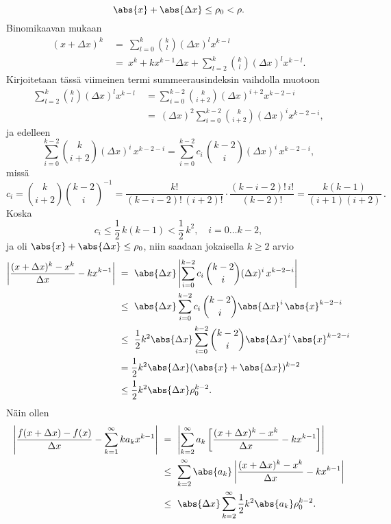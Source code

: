 \[
\abs{x}+\abs{\Delta x} \le \rho_0<\rho.
\]
Binomikaavan mukaan
\begin{align*}
(x+\Delta x)^k\ &=\ \sum_{l=0}^k \binom{k}{l} (\Delta x)^l x^{k-l} \\
                &=\ x^k + kx^{k-1}\Delta x + \sum_{l=2}^k \binom{k}{l} (\Delta x)^l x^{k-l}.
\end{align*}
Kirjoitetaan tässä viimeinen termi summeerausindeksin vaihdolla muotoon
\begin{align*}
\sum_{l=2}^k \binom{k}{l} (\Delta x)^l x^{k-l}\ 
              &= \sum_{i=0}^{k-2} \binom{k}{i+2} (\Delta x)^{i+2} x^{k-2-i} \\
              &=\ (\Delta x)^2 \sum_{i=0}^{k-2} \binom{k}{i+2} (\Delta x)^i x^{k-2-i},
\end{align*}
ja edelleen
\[
\sum_{i=0}^{k-2} \binom{k}{i+2} (\Delta x)^i\,x^{k-2-i} 
                = \sum_{i=0}^{k-2} c_i\,\binom{k-2}{i} (\Delta x)^i\,x^{k-2-i},
\]
missä
\[
c_i = \binom{k}{i+2} \binom{k-2}{i}^{-1} 
    = \frac{k!}{(k-i-2)!\,(i+2)!} \cdot \frac{(k-i-2)!\,i!}{(k-2)!} 
    = \frac{k(k-1)}{(i+1)(i+2)}\,.
\]
Koska
\[
c_i \le \frac{1}{2}\,k(k-1) < \frac{1}{2}\,k^2, \quad i = 0 \ldots k-2,
\]
ja oli $\abs{x}+\abs{\Delta x} \le \rho_0$, niin saadaan jokaisella $k \ge 2$ arvio
\begin{align*}
\left|\frac{(x+\Delta x)^k - x^k}{\Delta x} - kx^{k-1}\right|\ 
 &=\ \abs{\Delta x} \left|\sum_{i=0}^{k-2} c_i\,\binom{k-2}{i} (\Delta x)^i\,x^{k-2-i}\right| \\
 &\le\ \abs{\Delta x} \sum_{i=0}^{k-2} c_i\,\binom{k-2}{i} \abs{\Delta x}^i\,\abs{x}^{k-2-i} \\
 &\le\ \frac{1}{2}k^2\abs{\Delta x} 
               \sum_{i=0}^{k-2} \binom{k-2}{i} \abs{\Delta x}^i\,\abs{x}^{k-2-i} \\
 &= \frac{1}{2}k^2\abs{\Delta x}(\abs{x}+\abs{\Delta x})^{k-2} \\
 &\le \frac{1}{2}k^2\abs{\Delta x}\rho_0^{k-2}.
\end{align*}
Näin ollen
\begin{align*}
\left| \frac{f(x+\Delta x)-f(x)}{\Delta x} - \sum_{k=1}^\infty ka_kx^{k-1} \right|\ 
       &=\ \left|\sum_{k=2}^\infty a_k
                 \left[\frac{(x+\Delta x)^k - x^k}{\Delta x} - kx^{k-1}\right]\right| \\
       &\le\ \sum_{k=2}^\infty \abs{a_k}
             \left|\frac{(x+\Delta x)^k - x^k}{\Delta x} - kx^{k-1}\right| \\
       &\le\ \abs{\Delta x}\sum_{k=2}^\infty \frac{1}{2}k^2\abs{a_k}\rho_0^{k-2}.
\end{align*}

